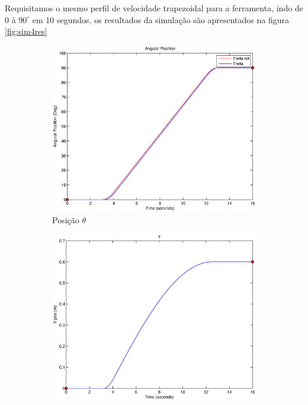 \documentclass{article}
\begin{document}
Requisitamos o mesmo perfil de velocidade trapezoidal para a ferramenta, indo de $0$ à $90^\circ$ em 10 segundos, os resultados da simulação são apresentados na figura \ref{fig:sim4res}

\begin{figure}[H]
	\centering
	\begin{subfigure}{0.3\textwidth}
		\includegraphics[width=\linewidth]{matlab/theta4}
		\caption{Posição $\theta$}
	\end{subfigure}
	\begin{subfigure}{0.3\textwidth}
		\includegraphics[width=\linewidth]{matlab/y4}

\end{subfigure}
\end{figure}
\end{document}
